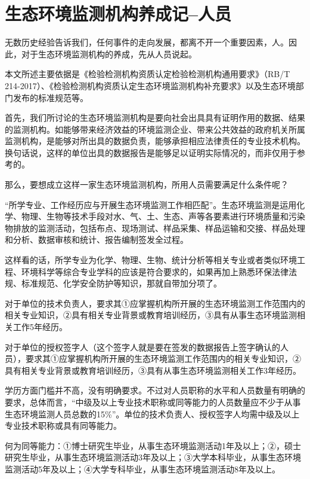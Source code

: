 \documentclass[
]{book}
\begin{document}
\hypertarget{ux751fux6001ux73afux5883ux76d1ux6d4bux673aux6784ux517bux6210ux8bb0ux4ebaux5458}{%
\section{生态环境监测机构养成记--人员}\label{ux751fux6001ux73afux5883ux76d1ux6d4bux673aux6784ux517bux6210ux8bb0ux4ebaux5458}}

无数历史经验告诉我们，任何事件的走向发展，都离不开一个重要因素，人。因此，对于生态环境监测机构的养成，先从人员说起。

本文所述主要依据是《检验检测机构资质认定检验检测机构通用要求》（RB/T 214-2017）、《检验检测机构资质认定生态环境监测机构补充要求》以及生态环境部门发布的标准规范等。

首先，我们所讨论的生态环境监测机构是要向社会出具具有证明作用的数据、结果的监测机构。如能够带来经济效益的环境监测企业、带来公共效益的政府机关所属监测机构，是能够对所出具的数据负责，能够承担相应法律责任的专业技术机构。换句话说，这样的单位出具的数据报告是能够足以证明实际情况的，而非仅用于参考的。

那么，要想成立这样一家生态环境监测机构，所用人员需要满足什么条件呢？

``所学专业、工作经历应与开展生态环境监测工作相匹配''。生态环境监测是运用化学、物理、生物等技术手段对水、气、土、生态、声等各要素进行环境质量和污染物排放的监测活动，包括布点、现场测试、样品采集、样品运输和交接、样品处理和分析、数据审核和统计、报告编制签发全过程。

这样看的话，所学专业为化学、物理、生物、统计分析等相关专业或者类似环境工程、环境科学等综合专业学科的应该是符合要求的，如果再加上熟悉环保法律法规、标准规范、化学安全防护等知识，那就自带加分项了。

对于单位的技术负责人，要求其①应掌握机构所开展的生态环境监测工作范围内的相关专业知识，②具有相关专业背景或教育培训经历，③具有从事生态环境监测相关工作5年经历。

对于单位的授权签字人（这个签字人就是要在签发的数据报告上签字确认的人员），要求其①应掌握机构所开展的生态环境监测工作范围内的相关专业知识，②具有相关专业背景或教育培训经历，③具有从事生态环境监测相关工作3年经历。

学历方面门槛并不高，没有明确要求。不过对人员职称的水平和人员数量有明确的要求，总体而言，``中级及以上专业技术职称或同等能力的人员数量应不少于从事生态环境监测人员总数的15\%''。单位的技术负责人、授权签字人均需中级及以上专业技术职称或具有同等能力。

何为同等能力：①博士研究生毕业，从事生态环境监测活动1年及以上；②，硕士研究生毕业，从事生态环境监测活动3年及以上；③大学本科毕业，从事生态环境监测活动5年及以上；④大学专科毕业，从事生态环境监测活动8年及以上。
\end{document}
